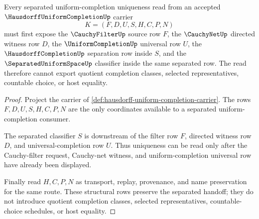 \begin{theorem}
\label{thm:hausdorff-uniform-completion-separation-handoff}
Every separated uniform-completion uniqueness read from an accepted $\HausdorffUniformCompletionUp$ carrier
$$
K=(F,D,U,S,H,C,P,N)
$$
must first expose the $\CauchyFilterUp$ source row $F$, the $\CauchyNetUp$ directed witness row $D$, the $\UniformCompletionUp$ universal row $U$, the $\HausdorffCompletionUp$ separation row inside $S$, and the $\SeparatedUniformSpaceUp$ classifier inside the same separated row. The read therefore cannot export quotient completion classes, selected representatives, countable choice, or host equality.
\end{theorem}
\begin{proof}
Project the carrier of \autoref{def:hausdorff-uniform-completion-carrier}. The rows $F,D,U,S,H,C,P,N$ are the only coordinates available to a separated uniform-completion consumer.

The separated classifier $S$ is downstream of the filter row $F$, directed witness row $D$, and universal-completion row $U$. Thus uniqueness can be read only after the Cauchy-filter request, Cauchy-net witness, and uniform-completion universal row have already been displayed.

Finally read $H,C,P,N$ as transport, replay, provenance, and name preservation for the same route. These structural rows preserve the separated handoff; they do not introduce quotient completion classes, selected representatives, countable-choice schedules, or host equality.
\end{proof}


